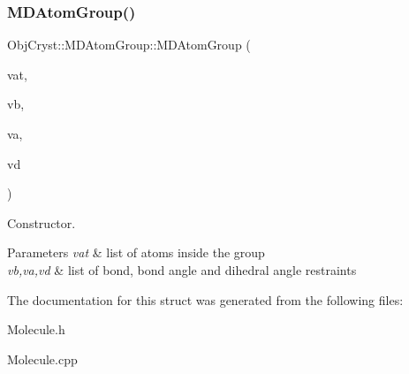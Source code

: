 \subsubsection{\texorpdfstring{MDAtomGroup()}{MDAtomGroup()}}
{\footnotesize\ttfamily Obj\+Cryst\+::\+M\+D\+Atom\+Group\+::\+M\+D\+Atom\+Group (\begin{DoxyParamCaption}\item[{std\+::set$<$ \mbox{\hyperlink{class_obj_cryst_1_1_mol_atom}{Mol\+Atom}} $\ast$ $>$ \&}]{vat,  }\item[{std\+::set$<$ \mbox{\hyperlink{class_obj_cryst_1_1_mol_bond}{Mol\+Bond}} $\ast$ $>$ \&}]{vb,  }\item[{std\+::set$<$ \mbox{\hyperlink{class_obj_cryst_1_1_mol_bond_angle}{Mol\+Bond\+Angle}} $\ast$ $>$ \&}]{va,  }\item[{std\+::set$<$ \mbox{\hyperlink{class_obj_cryst_1_1_mol_dihedral_angle}{Mol\+Dihedral\+Angle}} $\ast$ $>$ \&}]{vd }\end{DoxyParamCaption})}

Constructor. 
\begin{DoxyParams}{Parameters}
{\em vat} & list of atoms inside the group \\
\hline
{\em vb,va,vd} & list of bond, bond angle and dihedral angle restraints \\
\hline
\end{DoxyParams}


The documentation for this struct was generated from the following files\+:\begin{DoxyCompactItemize}
\item 
Molecule.\+h\item 
Molecule.\+cpp\end{DoxyCompactItemize}
